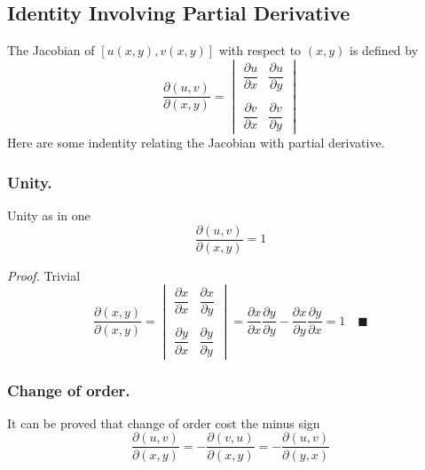 \documentclass[../../../Main.tex]{subfiles}
\begin{document}
\subsection*{Identity Involving Partial Derivative}
The Jacobian of $[u(x,y), v(x,y)]$ with respect to $(x, y)$ is defined by
\begin{equation*}
    \frac{\partial (u,v)}{\partial (x,y)}=\begin{vmatrix}
       \dfrac{\partial u}{\partial x} & \dfrac{\partial u}{\partial y}\\
       \\
       \dfrac{\partial v}{\partial x} & \dfrac{\partial v}{\partial y}
    \end{vmatrix}    
\end{equation*}
Here are some indentity relating the Jacobian with partial derivative.

\subsubsection*{Unity.} Unity as in one
\begin{equation*}
    \frac{\partial (u,v)}{\partial (x,y)}=1
\end{equation*}

\emph{Proof.} Trivial
\begin{equation*}
    \frac{\partial (x,y)}{\partial (x,y)}=\begin{vmatrix}
        \dfrac{\partial x}{\partial x} & \dfrac{\partial x}{\partial y}\\
        \\
        \dfrac{\partial y}{\partial x} & \dfrac{\partial y}{\partial y}
     \end{vmatrix}=\dfrac{\partial x}{\partial x} \dfrac{\partial y}{\partial y}-   \dfrac{\partial x}{\partial y}\dfrac{\partial y}{\partial x}  =1\quad\blacksquare
\end{equation*}

\subsubsection*{Change of order.} It can be proved that change of order cost the minus sign 
\begin{equation*}
    \frac{\partial (u,v)}{\partial (x,y)}=- \frac{\partial (v,u)}{\partial (x,y)}= -\frac{\partial (u,v)}{\partial (y,x)}
\end{equation*}
\end{document}
